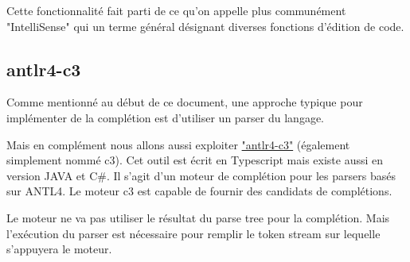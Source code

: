 \documentclass[
    iict, %
    il, %
]{heig-tb}
\begin{document}









Cette fonctionnalité fait parti de ce qu'on appelle plus communément "IntelliSense" \cite{intelliSense} qui un terme général désignant diverses fonctions d'édition de code.


\subsection{antlr4-c3}

Comme mentionné au début de ce document, une approche typique pour implémenter de la complétion est d'utiliser un parser du langage.

Mais en complément nous allons aussi exploiter \href{https://github.com/mike-lischke/antlr4-c3}{"antlr4-c3"} (également simplement nommé c3).
Cet outil est écrit en Typescript mais existe aussi en version JAVA et C\#.
Il s'agit d'un moteur de complétion pour les parsers basés sur ANTL4. Le moteur c3 est capable de fournir des candidats de complétions.

Le moteur ne va pas utiliser le résultat du parse tree pour la complétion. Mais l'exécution du parser est nécessaire pour remplir le token stream sur lequelle s'appuyera le moteur.
\end{document}
